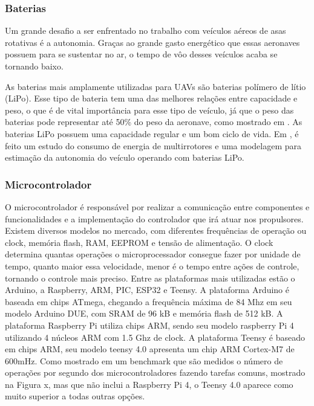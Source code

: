 \subsubsection{Baterias}

Um grande desafio a ser enfrentado no trabalho com veículos aéreos de asas rotativas é a autonomia. Graças ao grande gasto energético que essas aeronaves possuem para se sustentar no ar, o tempo de vôo desses veículos acaba se tornando baixo.   

As baterias mais amplamente utilizadas para UAVs são baterias polímero de lítio (LiPo). Esse tipo de bateria tem uma das melhores relações entre capacidade e peso, o que é de vital importância para esse tipo de veículo, já que o peso das baterias pode representar até 50\% do peso da aeronave, como mostrado em \cite{Mulgaonkar2014}. As baterias LiPo possuem uma capacidade regular e um bom ciclo de vida. Em \cite{Abdilla2015b}, é feito um estudo do consumo de energia de multirrotores e uma modelagem para estimação da autonomia do veículo operando com baterias LiPo.  


\subsubsection{Microcontrolador}

O microcontrolador é responsável por realizar a comunicação entre componentes e funcionalidades e a implementação do controlador que irá atuar nos propulsores. Existem diversos modelos no mercado, com diferentes frequências de operação ou clock, memória flash, RAM, EEPROM e tensão de alimentação. O clock determina quantas operações o microprocessador consegue fazer por unidade de tempo, quanto maior essa velocidade, menor é o tempo entre ações de controle, tornando o controle mais preciso. Entre as plataformas mais utilizadas estão o Arduino, a Raspberry, ARM, PIC, ESP32 e Teensy. A plataforma Arduino é baseada em chips ATmega, chegando a frequência máxima de 84 Mhz em seu modelo Arduino DUE, com SRAM de 96 kB e memória flash de 512 kB. A plataforma Raspberry Pi utiliza chips ARM, sendo seu modelo raspberry Pi 4 utilizando 4 núcleos ARM com 1.5 Ghz de clock. A plataforma Teensy é baseado em chips ARM, seu modelo teensy 4.0 apresenta um chip ARM Cortex-M7 de 600mHz. Como mostrado em um benchmark que são medidos o número de operações por segundo dos microcontroladores fazendo tarefas comuns, mostrado na Figura x, mas que não inclui a Raspberry Pi 4, o Teensy 4.0 aparece como muito superior a todas outras opções.

